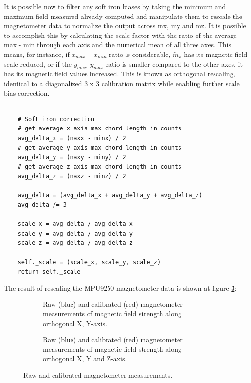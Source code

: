 It is possible now to filter any soft iron biases by taking the minimum and maximum field measured already computed and manipulate them to rescale the magnetometer data to normalize the output across mx, my and mz. It is possible to accomplish this by calculating the scale factor with the ratio of the average max - min through each axis and the numerical mean of all three axes. This means, for instance, if $x_{max} - x_{min}$ ratio is considerable, $\widetilde{m}_x$ has its magnetic field scale reduced, or if the $y_{max} – y_{max}$ ratio is smaller compared to the other axes, it has its magnetic field values increased. This is known as orthogonal rescaling, identical to a diagonalized 3 x 3 calibration matrix while enabling further scale bias correction.

\lstset{language=Python}
\begin{lstlisting}[frame=single]  % Start your code-block

    # Soft iron correction
    # get average x axis max chord length in counts
    avg_delta_x = (maxx - minx) / 2
    # get average y axis max chord length in counts
    avg_delta_y = (maxy - miny) / 2
    # get average z axis max chord length in counts
    avg_delta_z = (maxz - minz) / 2

    avg_delta = (avg_delta_x + avg_delta_y + avg_delta_z)
    avg_delta /= 3

    scale_x = avg_delta / avg_delta_x
    scale_y = avg_delta / avg_delta_y
    scale_z = avg_delta / avg_delta_z

    self._scale = (scale_x, scale_y, scale_z)
    return self._scale

\end{lstlisting}

The result of rescaling the MPU9250 magnetometer data is shown at figure \ref{fig:mag_calibration_output}:

\begin{figure}[!h]
    \centering
    \begin{subfigure}{0.49\textwidth}
        \centering
        \resizebox{1\linewidth}{!}{}
        \caption{Raw (blue) and calibrated (red) magnetometer measurements of magnetic field strength along orthogonal X, Y-axis.}
        \label{fig:magnetometer_calibrated2D}
    \end{subfigure}
    \begin{subfigure}{0.49\textwidth}
        \centering
        \resizebox{1\linewidth}{!}{}
        \caption{Raw (blue) and calibrated (red) magnetometer measurements of magnetic field strength along orthogonal X, Y and Z-axis.}
        \label{fig:magnetometer_calibrated3D}
    \end{subfigure}
    \caption{Raw and calibrated magnetometer measurements.}
    \label{fig:mag_calibration_output}
\end{figure}


